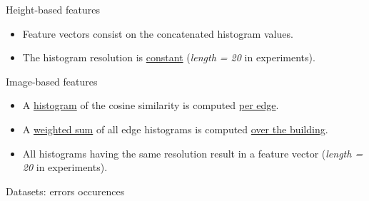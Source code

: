 \documentclass[10pt, export]{beamer}
\begin{document}
    \begin{frame}{Height-based features}
        \begin{figure}
            
        \end{figure}
        \begin{itemize}[label=$\blacktriangleright$, font=\color{IGNGreen}]
            \item \footnotesize Feature vectors consist on the concatenated histogram values.
            \item \footnotesize The histogram resolution is \underline{constant} (\textit{length = 20} in experiments).
        \end{itemize}
    \end{frame}
    \begin{frame}{Image-based features}
        \begin{figure}
            \begin{center}
                
            \end{center}
        \end{figure}
        \begin{itemize}[label=$\blacktriangleright$, font=\color{IGNGreen}]
            \item \footnotesize A \underline{histogram} of the cosine similarity is computed \underline{per edge}.
            \item \footnotesize A \underline{weighted sum} of all edge histograms is computed \underline{over the building}.
            \item \footnotesize All histograms having the same resolution result in a feature vector (\textit{length = 20} in experiments).
        \end{itemize}
    \end{frame}
    \begin{frame}{Datasets: errors occurences}
    \end{frame}
\end{document}
